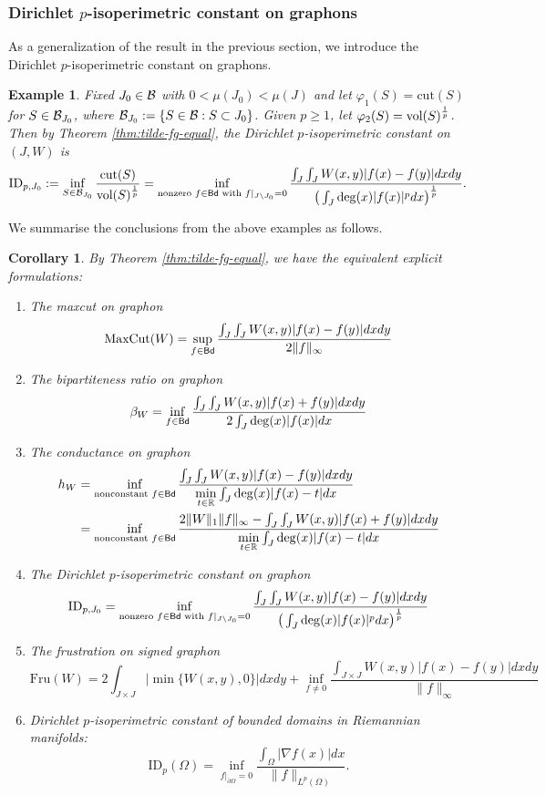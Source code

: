 \documentclass[12pt,a4paper]{article}
\newtheorem{corollary}[theorem]{Corollary}
\newtheorem{example}[theorem]{Example}
\begin{document}
\subsubsection{Dirichlet $p$-isoperimetric constant on graphons}

As a generalization of the result in the previous section, we introduce the Dirichlet $p$-isoperimetric constant on graphons.

\begin{example}%

Fixed $J_0\in \mathcal{B}$ with $0<\mu(J_0)<\mu(J)$ %
and let $\varphi_1(S)=\mathrm{cut}(S)$ for $S\in\mathcal{B}_{J_0}$, where $\mathcal{B}_{J_0}:=\{S\in \mathcal{B}:S\subset J_0\}$. Given $p\ge 1$, let  $\varphi_2(S)=\text{\rm vol}(S)^{\frac1p}$.  
Then  by Theorem \ref{thm:tilde-fg-equal}, the Dirichlet $p$-isoperimetric constant on $(J,W)$ is 
$$\mathrm{ID}_{p,J_0}:=\inf_{S\in\mathcal{B}_{J_0}}\frac{\mathrm{cut}(S)}{\text{\rm vol}(S)^{\frac1p}}=\inf_{\text{nonzero }f\in {\sf Bd}\text{ with }f|_{J\setminus J_0}=0}\frac{\int_J\int_JW(x,y)|f(x)-f(y)|dxdy}{\big(\int_{J} \deg(x)|f(x)|^pdx\big)^{\frac1p}} . $$
\end{example}
We summarise the conclusions from the above examples as follows.
\begin{corollary}\label{cor:6-equality}By Theorem \ref{thm:tilde-fg-equal}, we have the equivalent explicit formulations: 
\begin{enumerate}
\item The maxcut on graphon
$$ \mathrm{MaxCut}(W)=\sup_{f\in {\sf Bd} }\frac{\int_{J}\int_{J} W(x,y)|f(x)-f(y)|dxdy}{2\|f\|_\infty}$$
\item The bipartiteness ratio on graphon
$$\beta_W=\inf_{f\in {\sf Bd}}\frac{\int_J\int_JW(x,y)|f(x)+f(y)|dxdy}{2\int_J\deg(x)|f(x)|dx} $$
\item The conductance on graphon
\begin{align*}
h_W&=\inf_{\text{nonconstant }f\in {\sf Bd}}\frac{\int_J\int_JW(x,y)|f(x)-f(y)|dxdy}{\min\limits_{t\in\mathbb{R}}\int_{J} \deg(x)|f(x)-t|dx}
\\&=
\inf_{\text{nonconstant }f\in {\sf Bd}}\frac{2\|W\|_1\|f\|_\infty-\int_J\int_JW(x,y)|f(x)+f(y)|dxdy}{\min\limits_{t\in\mathbb{R}}\int_{J} \deg(x)|f(x)-t|dx} 
\end{align*}
\item The Dirichlet $p$-isoperimetric constant on graphon
$$\mathrm{ID}_{p,J_0}=\inf_{\text{nonzero }f\in {\sf Bd}\text{ with }f|_{J\setminus J_0}=0}\frac{\int_J\int_JW(x,y)|f(x)-f(y)|dxdy}{\big(\int_{J} \deg(x)|f(x)|^pdx\big)^{\frac1p}} $$
\item The frustration on signed graphon
$$ \mathrm{Fru}(W)=2\int_{J\times J}|\min\{W(x,y),0\}|dxdy+\inf\limits_{f\ne0}\frac{\int_{J\times J}W(x,y)|f(x)-f(y)|dxdy}{\|f\|_\infty}$$
\item Dirichlet $p$-isoperimetric constant of bounded domains in Riemannian manifolds:
$$\mathrm{ID}_p(\Omega)=\inf_{f|_{\partial \Omega}=0}\frac{\int_\Omega|\nabla f(x)|dx}{\|f\|_{L^p(\Omega)}}.$$
\end{enumerate}
\end{corollary}
\end{document}

